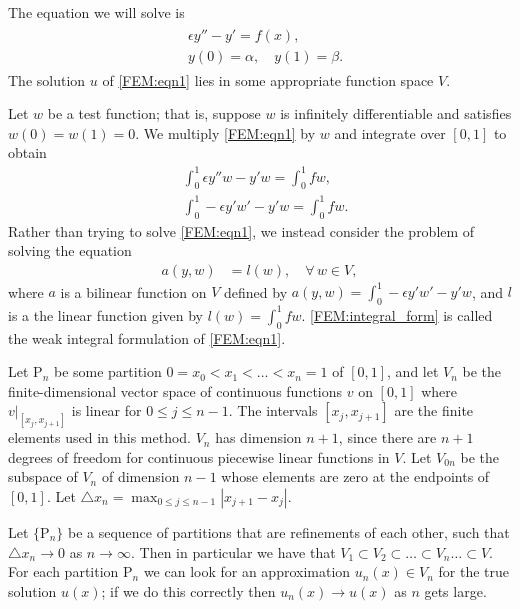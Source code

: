 \label{lab:FEM}

The equation we will solve is 
\begin{align}
	\begin{split}
	&{ }\epsilon y'' - y' = f(x),\\
	&{ }y(0) = \alpha, \quad y(1) = \beta . 
	\end{split}\label{FEM:eqn1}
\end{align}
The solution $u$ of \eqref{FEM:eqn1} lies in some appropriate function space $V$.%


Let $w$ be a test function; that is, suppose $w$ is infinitely differentiable and satisfies
$w(0) = w(1) = 0$. We multiply \eqref{FEM:eqn1} by $w$ and integrate over $[0,1]$ to obtain 
\begin{align*}
	&{ } \int_0^1 \epsilon y''w - y'w = \int_0^1 f w, \\
	&{ } \int_0^1 -\epsilon y'w' - y'w = \int_0^1 f w.
\end{align*}
Rather than trying to solve \eqref{FEM:eqn1}, we instead consider the problem of solving the equation 
\begin{align}
	a(y,w) &= l(w), \quad \forall \, w \in V,
	\label{FEM:integral_form}
\end{align}
where $a$ is a bilinear function on $V$ defined by $a(y,w) = \int_0^1 -\epsilon y'w' - y'w$, and $l$ is a the linear function given by $l(w) = \int_0^1 f w$.  \eqref{FEM:integral_form} is called the weak integral formulation of \eqref{FEM:eqn1}.




Let $\mathrm{P}_n$ be some partition $0 = x_0 < x_1< \ldots < x_{n} = 1$ of $[0,1]$, and let $V_n$ be the finite-dimensional vector space of continuous functions $v$ on $[0,1]$ where $v|_{[{x_j,x_{j+1}}]}$ is linear for $0 \leq j \leq n-1$. The intervals $[{x_j,x_{j+1}}]$ are the finite elements used in this method.  $V_n$ has dimension $n+1$, since there are $n+1$ degrees of freedom for continuous piecewise linear functions in $V$. Let $V_{0n}$ be the subspace of $V_n$ of dimension $n-1$ whose elements are zero at the endpoints of $[0,1]$. 
Let $\triangle x_n = \max_{0 \leq j \leq n-1}|x_{j+1} - x_j|$. 

Let $\{\mathrm{P}_n\}$ be a sequence of partitions that are refinements of each other, such that $\triangle x_n \to 0$ as $n \to \infty$. Then in particular we have that $V_1 \subset V_2 \subset \ldots \subset V_n \ldots \subset V$.  For each partition $\mathrm{P}_n$ we can look for an approximation $u_n(x) \in V_n$ for the true solution $u(x)$; if we do this correctly then $u_n(x) \to u(x)$ as $n$ gets large. 


